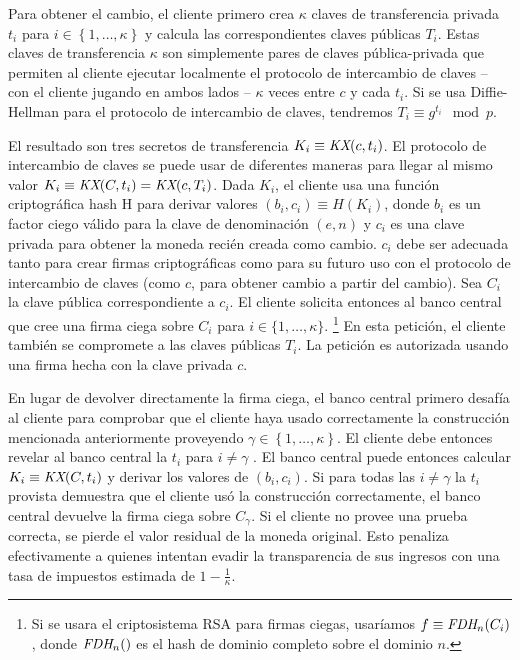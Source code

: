 \documentclass[10pt,spanish]{article}
\begin{document}
Para obtener el cambio, el cliente primero crea $\kappa$ claves de
transferencia privada $t_{i}$ para
$i \in \left\{ 1,\ldots,\kappa \right\}$ y calcula las
correspondientes claves públicas $T_{i}$. Estas claves de
transferencia $\kappa$ son simplemente pares de claves pública-privada
que permiten al cliente ejecutar localmente el protocolo de intercambio
de claves -- con el cliente jugando en ambos lados -- $\kappa$ veces
entre $c$ y cada $t_{i}$. Si se usa Diffie-Hellman para el protocolo de
intercambio de claves, tendremos
$T_{i} \equiv g^{t_{i}} \mod p$.

El resultado son tres secretos de transferencia
$K_{i} \equiv \emph{KX}(c,t_{i})$. El protocolo de
intercambio de claves se puede usar de diferentes maneras para llegar al
mismo valor
$K_{i} \equiv \emph{KX}(C,t_{i}) = \emph{KX}(c,T_{i})$.
Dada $K_{i}$, el cliente usa una función criptográfica hash H para
derivar valores
$(b_{i},c_{i}) \equiv H(K_{i})$, donde
$b_{i}$ es un factor ciego válido para la clave de denominación
$(e,n)$ y $c_{i}$ es una clave privada para obtener la
moneda recién creada como cambio. $c_{i}$ debe ser adecuada tanto para
crear firmas criptográficas como para su futuro uso con el protocolo de
intercambio de claves (como $c$, para obtener cambio a partir del cambio).
Sea $C_{i}$ la clave pública correspondiente a $c_{i}$. El cliente
solicita entonces al banco central que cree una firma ciega sobre
$C_{i}$ para $i \in \{ 1,\ldots,\kappa\}$. \footnote
{Si se usara el criptosistema RSA para firmas ciegas, usaríamos
$f \equiv \emph{FDH}_{n}(C_{i})$, donde
$\emph{FDH}_{n}()$ es el hash de dominio completo sobre
el dominio $n$.} En esta petición, el cliente también se compromete a
las claves públicas $T_{i}$. La petición es autorizada usando una
firma hecha con la clave privada $c$.

En lugar de devolver directamente la firma ciega, el banco central
primero desafía al cliente para comprobar que el cliente haya usado
correctamente la construcción mencionada anteriormente proveyendo
$\gamma \in \left\{ 1,\ldots,\kappa \right\}$. El cliente debe
entonces revelar al banco central la $t_{i}$ para $i \neq \gamma$ .
El banco central puede entonces calcular
$K_{i} \equiv \emph{KX}(C,t_{i})$ y derivar los valores
de $(b_{i},c_{i})$. Si para todas las $i \neq \gamma$
la $t_{i}$ provista demuestra que el cliente usó la construcción
correctamente, el banco central devuelve la firma ciega sobre
$C_{\gamma}$. Si el cliente no provee una prueba correcta, se pierde
el valor residual de la moneda original. Esto penaliza efectivamente a
quienes intentan evadir la transparencia de sus ingresos con una tasa de
impuestos estimada de $1 - \frac{1}{\kappa}$.
\end{document}
